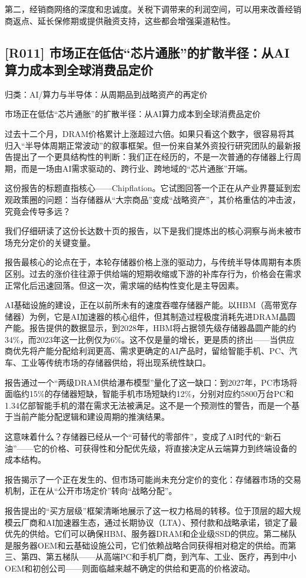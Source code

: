 \documentclass[11pt]{ctexart}
\begin{document}
第二，经销商网络的深度和忠诚度。关税下调带来的利润空间，可以用来改善经销商返点、延长保修期或提供融资支持，这些都会增强渠道粘性。

\subsection{[R011] 市场正在低估“芯片通胀”的扩散半径：从AI算力成本到全球消费品定价}
{\small\color{refgray}归类：AI/算力与半导体：从周期品到战略资产的再定价}

市场正在低估“芯片通胀”的扩散半径：从AI算力成本到全球消费品定价

过去十二个月，DRAM价格累计上涨超过六倍。如果只看这个数字，很容易将其归入“半导体周期正常波动”的叙事框架。但一份来自某外资投行研究团队的最新报告提出了一个更具结构性的判断：我们正在经历的，不是一次普通的存储器上行周期，而是一场由AI需求驱动的、跨行业、跨地域的“芯片通胀”开端。

这份报告的标题直指核心——Chipflation。它试图回答一个正在从产业界蔓延到宏观政策圈的问题：当存储器从“大宗商品”变成“战略资产”，其价格重估的冲击波，究竟会传导多远？

我们仔细研读了这份长达数十页的报告，以下是我们提炼出的核心洞察与尚未被市场充分定价的关键变量。

报告最核心的论点在于，本轮存储器价格上涨的驱动力，与传统半导体周期有本质区别。过去的涨价往往源于供给端的短期收缩或下游的补库存行为，价格会在需求正常化后迅速回落。但这一次，需求端的结构性变化是主导因素。

AI基础设施的建设，正在以前所未有的速度吞噬存储器产能。以HBM（高带宽存储器）为例，它是AI加速器的核心组件，但其制造过程极度消耗先进DRAM晶圆产能。报告提供的数据显示，到2028年，HBM将占据领先级存储器晶圆产能的约34\%，而2023年这一比例仅为6\%。这不仅是量的增长，更是质的挤出——当供应商优先将产能分配给利润更高、需求更确定的AI产品时，留给智能手机、PC、汽车、工业等传统市场的存储器供给，将出现系统性缺口。

报告通过一个“两级DRAM供给瀑布模型”量化了这一缺口：到2027年，PC市场将面临约15\%的存储器短缺，智能手机市场短缺约12\%，分别对应约5800万台PC和1.34亿部智能手机的潜在需求无法被满足。这不是一个预测性的警告，而是一个基于当前产能分配逻辑和建设周期的推演结果。

这意味着什么？存储器已经从一个“可替代的零部件”，变成了AI时代的“新石油”——它的价格、可获得性和分配优先级，将直接决定从云端算力到终端设备的成本结构。

报告揭示了一个正在发生的、但市场可能尚未充分定价的变化：存储器市场的交易机制，正在从“公开市场定价”转向“战略分配”。

报告提出的“买方层级”框架清晰地展示了这一权力格局的转移。位于顶层的超大规模云厂商和AI加速器生态，通过长期协议（LTA）、预付款和战略承诺，锁定了最优先的供给。它们可以确保HBM、服务器DRAM和企业级SSD的供应。第二梯队是服务器OEM和云基础设施公司，它们依赖战略合同获得相对稳定的供给。而第三、第四、第五梯队——从高端PC和手机厂商，到汽车、工业、医疗，再到中小OEM和初创公司——则面临越来越不确定的供给和更高的价格波动。
\end{document}
